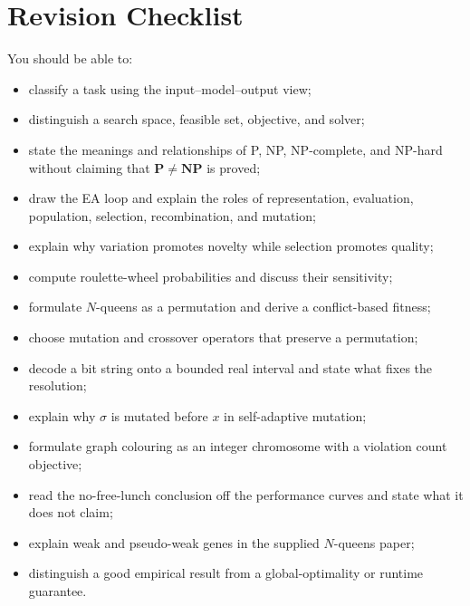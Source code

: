\documentclass[11pt,a4paper]{article}
\begin{document}
\section{Revision Checklist}

You should be able to:
{\small
\begin{itemize}[leftmargin=*,nosep]
  \item classify a task using the input--model--output view;
  \item distinguish a search space, feasible set, objective, and solver;
  \item state the meanings and relationships of P, NP, NP-complete, and
        NP-hard without claiming that $\mathbf{P}\neq\mathbf{NP}$ is proved;
  \item draw the EA loop and explain the roles of representation, evaluation,
        population, selection, recombination, and mutation;
  \item explain why variation promotes novelty while selection promotes
        quality;
  \item compute roulette-wheel probabilities and discuss their sensitivity;
  \item formulate $N$-queens as a permutation and derive a conflict-based
        fitness;
  \item choose mutation and crossover operators that preserve a permutation;
  \item decode a bit string onto a bounded real interval and state what fixes
        the resolution;
  \item explain why $\sigma$ is mutated before $x$ in self-adaptive mutation;
  \item formulate graph colouring as an integer chromosome with a violation
        count objective;
  \item read the no-free-lunch conclusion off the performance curves and state
        what it does not claim;
  \item explain weak and pseudo-weak genes in the supplied $N$-queens paper;
  \item distinguish a good empirical result from a global-optimality or
        runtime guarantee.
\end{itemize}
}
\end{document}
